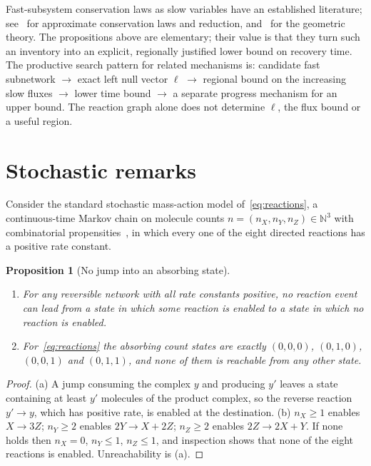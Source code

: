 \documentclass[11pt,a4paper]{article}
\theoremstyle{plain}
\newtheorem{proposition}[theorem]{Proposition}
\theoremstyle{definition}
\theoremstyle{remark}
\newcommand{\N}{\mathbb N}
\begin{document}
Fast-subsystem conservation laws as slow variables have an established literature; see~\cite{Desoeuvres2024} for approximate conservation laws and reduction, and~\cite{Fenichel1979} for the geometric theory. The propositions above are elementary; their value is that they turn such an inventory into an explicit, regionally justified lower bound on recovery time. The productive search pattern for related mechanisms is: candidate fast subnetwork $\to$ exact left null vector $\ell$ $\to$ regional bound on the increasing slow fluxes $\to$ lower time bound $\to$ a separate progress mechanism for an upper bound. The reaction graph alone does not determine $\ell$, the flux bound or a useful region.

\section{Stochastic remarks}
\label{sec:stochastic}
Consider the standard stochastic mass-action model of~\eqref{eq:reactions}, a continuous-time Markov chain on molecule counts $n=(n_X,n_Y,n_Z)\in\N^3$ with combinatorial propensities~\cite{Kurtz1972,Gillespie1977,AndersonKurtz2015}, in which every one of the eight directed reactions has a positive rate constant.

\begin{proposition}[No jump into an absorbing state]\label{prop:absorbing}
\begin{enumerate}[label=(\alph*)]
\item For any reversible network with all rate constants positive, no reaction event can lead from a state in which some reaction is enabled to a state in which no reaction is enabled.
\item For~\eqref{eq:reactions} the absorbing count states are exactly $(0,0,0)$, $(0,1,0)$, $(0,0,1)$ and $(0,1,1)$, and none of them is reachable from any other state.
\end{enumerate}
\end{proposition}

\begin{proof}
(a) A jump consuming the complex $y$ and producing $y'$ leaves a state containing at least $y'$ molecules of the product complex, so the reverse reaction $y'\to y$, which has positive rate, is enabled at the destination. (b) $n_X\ge1$ enables $X\to3Z$; $n_Y\ge2$ enables $2Y\to X+2Z$; $n_Z\ge2$ enables $2Z\to2X+Y$. If none holds then $n_X=0$, $n_Y\le1$, $n_Z\le1$, and inspection shows that none of the eight reactions is enabled. Unreachability is (a).
\end{proof}
\end{document}

